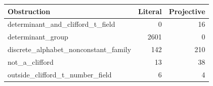 \begin{center}\small\begin{tabular}{lrr}\toprule
Obstruction & Literal & Projective\\\midrule
determinant\_and\_clifford\_t\_field & 0 & 16\\
determinant\_group & 2601 & 0\\
discrete\_alphabet\_nonconstant\_family & 142 & 210\\
not\_a\_clifford & 13 & 38\\
outside\_clifford\_t\_number\_field & 6 & 4\\
\bottomrule\end{tabular}\end{center}
